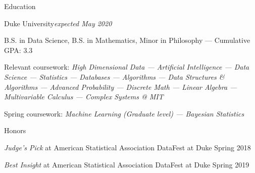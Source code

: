 \documentclass{resume} %
\begin{document}

\begin{rSection}{Education}

\begin{rSubsection}{Duke University}{\em expected May 2020}{}
\item  B.S. in Data Science, B.S. in Mathematics, Minor in Philosophy --- Cumulative GPA: 3.3
\item  Relevant coursework: {\em High Dimensional Data --- Artificial Intelligence --- Data Science --- Statistics --- Databases --- Algorithms --- Data Structures \& Algorithms --- Advanced Probability ---  Discrete Math  --- Linear Algebra --- Multivariable Calculus --- Complex Systems @ MIT}
\item Spring coursework: {\em Machine Learning (Graduate level) --- Bayesian Statistics}
\end{rSubsection}



\begin{rSubsection}{Honors}{}{}{}
	\item \textit{Judge's Pick} at American Statistical Association DataFest at Duke \hfill {Spring 2018}
	\item \textit{Best Insight} at American Statistical Association DataFest at Duke \hfill {Spring 2019}
\end{rSubsection}

\end{rSection}

\end{document}

